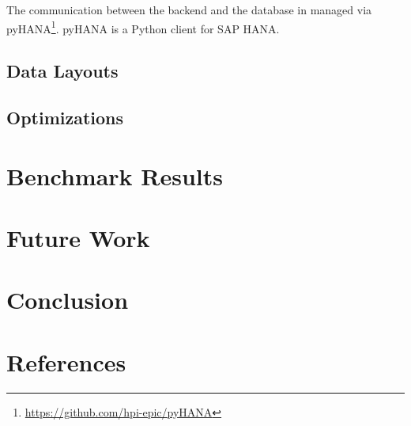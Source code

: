 \documentclass[10pt]{sig-alternate}
\begin{document}
The communication between the backend and the database in managed via pyHANA\footnote{\href{https://github.com/hpi-epic/pyHANA}{https://github.com/hpi-epic/pyHANA}}. pyHANA is a Python client for SAP HANA.


\subsection{Data Layouts}
\label{sec:data_layouts}

\subsection{Optimizations}

\section{Benchmark Results}

\section{Future Work}


\section{Conclusion}

\section{References}
\end{document}
